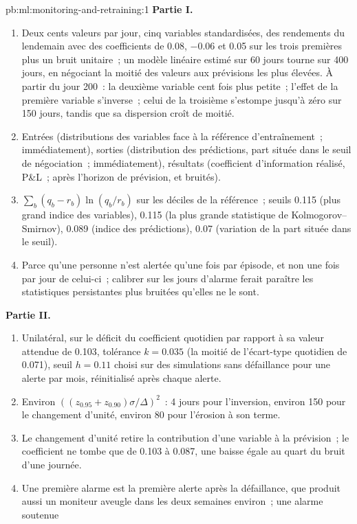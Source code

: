 \begin{solution}{pb:ml:monitoring-and-retraining:1}
\textbf{Partie I.}
\begin{enumerate}
\item Deux cents valeurs par jour, cinq variables standardisées, des rendements du lendemain avec des coefficients de 0.08, $-0.06$ et 0.05 sur les trois premières
plus un bruit unitaire~; un modèle linéaire estimé sur 60 jours tourne sur 400 jours, en négociant la moitié des valeurs aux prévisions les plus élevées. À partir du jour
200~: la deuxième variable cent fois plus petite~; l'effet de la première variable s'inverse~; celui de la troisième s'estompe jusqu'à zéro sur 150
jours, tandis que sa dispersion croît de moitié.
\item Entrées (distributions des variables face à la référence d'entraînement~; immédiatement), sorties (distribution des prédictions, part située dans
le seuil de négociation~; immédiatement), résultats (coefficient d'information réalisé, P\&L~; après l'horizon de prévision, et bruités).
\item $\sum_b(q_b-r_b)\ln(q_b/r_b)$ sur les déciles de la référence~; seuils 0.115 (plus grand indice des variables), 0.115 (la plus grande
statistique de Kolmogorov--Smirnov), 0.089 (indice des prédictions), 0.07 (variation de la part située dans le seuil).
\item Parce qu'une personne n'est alertée qu'une fois par épisode, et non une fois par jour de celui-ci~; calibrer sur les jours d'alarme ferait
paraître les statistiques persistantes plus bruitées qu'elles ne le sont.
\end{enumerate}
\textbf{Partie II.}
\begin{enumerate}[resume]
\item Unilatéral, sur le déficit du coefficient quotidien par rapport à sa valeur attendue de 0.103, tolérance $k=0.035$ (la moitié de l'écart-type
quotidien de 0.071), seuil $h=0.11$ choisi sur des simulations sans défaillance pour une alerte par mois, réinitialisé après chaque alerte.
\item Environ $((z_{0.95}+z_{0.90})\sigma/\Delta)^2$~: 4 jours pour l'inversion, environ 150 pour le changement d'unité, environ 80 pour l'érosion à son
terme.
\item Le changement d'unité retire la contribution d'une variable à la prévision~; le coefficient ne tombe que de 0.103 à 0.087, une
baisse égale au quart du bruit d'une journée.
\item Une première alarme est la première alerte après la défaillance, que produit aussi un moniteur aveugle dans les deux semaines environ~; une alarme soutenue

\end{enumerate}
\end{solution}
